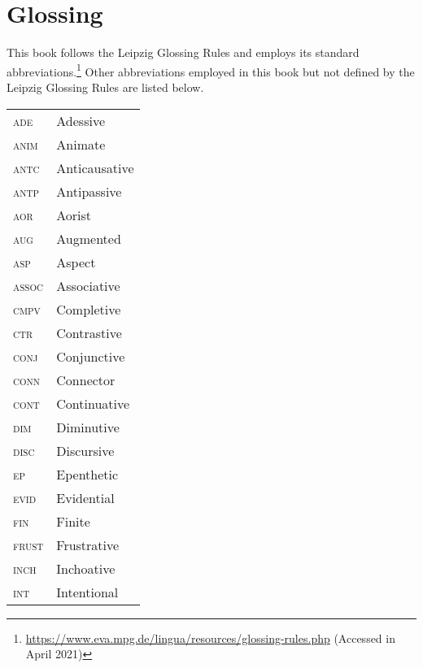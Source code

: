 \addchap{\lsAbbreviationsTitle}

\section*{Glossing}
This book follows the Leipzig Glossing Rules and employs its standard abbreviations.\footnote{\url{https://www.eva.mpg.de/lingua/resources/glossing-rules.php} (Accessed in April 2021)} Other abbreviations employed in this book but not defined by the Leipzig Glossing Rules are listed below.

\bigskip

\begin{tabularx}{.45\textwidth}{lQ}
	\textsc{ade} & Adessive \\
	\textsc{anim} & Animate \\
	\textsc{antc} & Anticausative \\
	\textsc{antp} & Antipassive \\
	\textsc{aor} & Aorist \\
	\textsc{aug} & Augmented \\
	\textsc{asp} & Aspect \\
	\textsc{assoc} & Associative \\
	\textsc{cmpv} & Completive \\
	\textsc{ctr} & Contrastive \\
	\textsc{conj} & Conjunctive \\
	\textsc{conn} & Connector \\
	\textsc{cont} & Continuative \\
	\textsc{dim} & Diminutive \\
	\textsc{disc} & Discursive \\
	\textsc{ep} & Epenthetic \\
	\textsc{evid} & Evidential \\
	\textsc{fin} & Finite \\
	\textsc{frust} & Frustrative \\
	\textsc{inch} & Inchoative \\
	\textsc{int} & Intentional \\
\end{tabularx}
